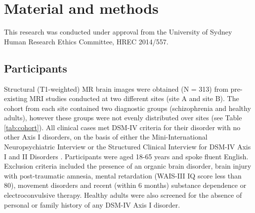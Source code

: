 \section{Material and methods}
This research was conducted under approval from the University of Sydney Human Research Ethics Committee, HREC 2014/557.
\subsection{Participants}
Structural (T1-weighted) MR brain images were obtained (N = 313) from pre-existing MRI studies conducted at two different sites (site A and site B). The cohort from each site contained two diagnostic groups (schizophrenia and healthy adults), however these groups were not evenly distributed over sites (see Table \ref{tab:cohort}). All clinical cases met DSM-IV criteria for their disorder with no other Axis I disorders, on the basis of either the Mini-International Neuropsychiatric Interview \citep{hergueta1998mini} or the Structured Clinical Interview for DSM-IV Axis I and II Disorders \citep{first2002structured}. Participants were aged 18-65 years and spoke fluent English. Exclusion criteria included the presence of an organic brain disorder, brain injury with post-traumatic amnesia, mental retardation (WAIS-III IQ score less than 80), movement disorders and recent (within 6 months) substance dependence or electroconvulsive therapy. Healthy adults were also screened for the absence of personal or family history of any DSM-IV Axis I disorder.

